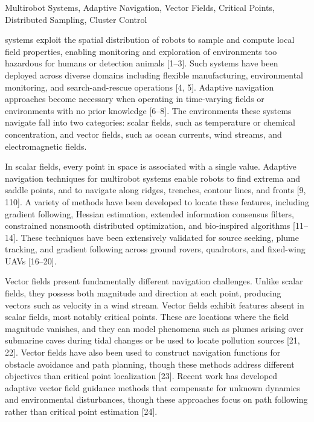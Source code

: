 \documentclass[lettersize,journal]{IEEEtran}
\begin{document}
\begin{IEEEkeywords}
Multirobot Systems, Adaptive Navigation, Vector Fields, Critical Points, Distributed Sampling, Cluster Control
\end{IEEEkeywords}

 systems exploit the spatial distribution of robots to sample and compute local field properties, enabling monitoring and exploration of environments too hazardous for humans or detection animals [1--3]. Such systems have been deployed across diverse domains including flexible manufacturing, environmental monitoring, and search-and-rescue operations [4, 5]. Adaptive navigation approaches become necessary when operating in time-varying fields or environments with no prior knowledge [6--8]. The environments these systems navigate fall into two categories: scalar fields, such as temperature or chemical concentration, and vector fields, such as ocean currents, wind streams, and electromagnetic fields.

In scalar fields, every point in space is associated with a single value. Adaptive navigation techniques for multirobot systems enable robots to find extrema and saddle points, and to navigate along ridges, trenches, contour lines, and fronts [9, 110]. A variety of methods have been developed to locate these features, including gradient following, Hessian estimation, extended information consensus filters, constrained nonsmooth distributed optimization, and bio-inspired algorithms [11--14]. These techniques have been extensively validated for source seeking, plume tracking, and gradient following across ground rovers, quadrotors, and fixed-wing UAVs  [16--20].

Vector fields present fundamentally different navigation challenges. Unlike scalar fields, they possess both magnitude and direction at each point, producing vectors such as velocity in a wind stream. Vector fields exhibit features absent in scalar fields, most notably critical points. These are locations where the field magnitude vanishes, and they can model phenomena such as plumes arising over submarine caves during tidal changes or be used to locate pollution sources [21, 22]. Vector fields have also been used to construct navigation functions for obstacle avoidance and path planning, though these methods address different objectives than critical point localization [23]. Recent work has developed adaptive vector field guidance methods that compensate for unknown dynamics and environmental disturbances, though these approaches focus on path following rather than critical point estimation [24].
\end{document}
